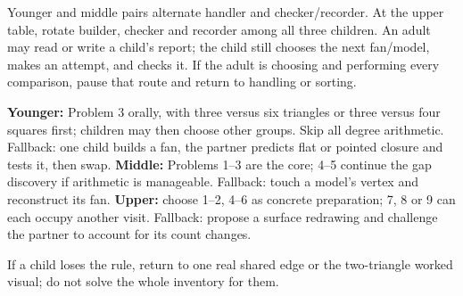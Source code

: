 \documentclass[11pt,letterpaper]{article}
\newcommand{\sub}[1]{\par\vspace{3pt}{\bfseries #1}\par}
\begin{document}
\begin{center}
\end{center}

\sub{Who does what}
Younger and middle pairs alternate handler and checker/recorder. At the upper table, rotate builder, checker and recorder among all three children. An adult may read or write a child's report; the child still chooses the next fan/model, makes an attempt, and checks it. If the adult is choosing and performing every comparison, pause that route and return to handling or sorting.

\sub{First routes and fallbacks}
\textbf{Younger:} Problem 3 orally, with three versus six triangles or three versus four squares first; children may then choose other groups. Skip all degree arithmetic. Fallback: one child builds a fan, the partner predicts flat or pointed closure and tests it, then swap. \textbf{Middle:} Problems 1--3 are the core; 4--5 continue the gap discovery if arithmetic is manageable. Fallback: touch a model's vertex and reconstruct its fan. \textbf{Upper:} choose 1--2, 4--6 as concrete preparation; 7, 8 or 9 can each occupy another visit. Fallback: propose a surface redrawing and challenge the partner to account for its count changes.\par
If a child loses the rule, return to one real shared edge or the two-triangle worked visual; do not solve the whole inventory for them.
\end{document}
